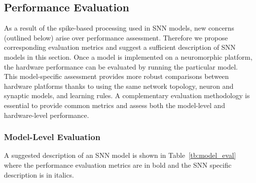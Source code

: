 \documentclass{frontiersENG} %
\begin{document}
\subsection{Performance Evaluation}
\label{sec:eval}
As a result of the spike-based processing used in SNN models, new concerns (outlined below) arise over performance assessment.
Therefore we propose corresponding evaluation metrics and suggest a sufficient description of SNN models in this section.
Once a model is implemented on a neuromorphic platform, the hardware performance can be evaluated by running the particular model.
This model-specific assessment provides more robust comparisons between hardware platforms thanks to using the same network topology, neuron and synaptic models, and learning rules. 
A complementary evaluation methodology is essential to provide common metrics and assess both the model-level and hardware-level performance.


\subsubsection{Model-Level Evaluation}
\label{subsec:model}

A suggested description of an SNN model is shown in Table~\ref{tb:model_eval} where the performance evaluation metrics are in bold and the SNN specific description is in italics.
\end{document}
